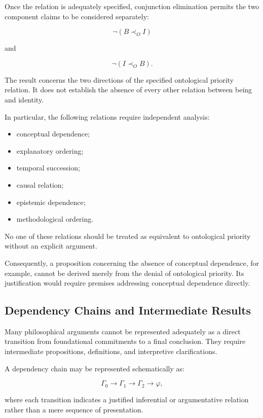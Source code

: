 Once the relation is adequately specified, conjunction
elimination permits the two component claims to be considered
separately:

\[
    \neg(B \prec_O I)
\]

and

\[
    \neg(I \prec_O B).
\]

The result concerns the two directions of the specified
ontological priority relation. It does not establish the
absence of every other relation between being and identity.

In particular, the following relations require independent
analysis:

\begin{itemize}
    \item conceptual dependence;
    \item explanatory ordering;
    \item temporal succession;
    \item causal relation;
    \item epistemic dependence;
    \item methodological ordering.
\end{itemize}

No one of these relations should be treated as equivalent to
ontological priority without an explicit argument.

Consequently, a proposition concerning the absence of
conceptual dependence, for example, cannot be derived merely
from the denial of ontological priority. Its justification
would require premises addressing conceptual dependence
directly.

\subsection{Dependency Chains and Intermediate Results}

Many philosophical arguments cannot be represented adequately
as a direct transition from foundational commitments to a
final conclusion. They require intermediate propositions,
definitions, and interpretive clarifications.

A dependency chain may be represented schematically as:

\[
    \Gamma_0
    \longrightarrow
    \Gamma_1
    \longrightarrow
    \Gamma_2
    \longrightarrow
    \varphi,
\]

where each transition indicates a justified inferential or
argumentative relation rather than a mere sequence of presentation.

